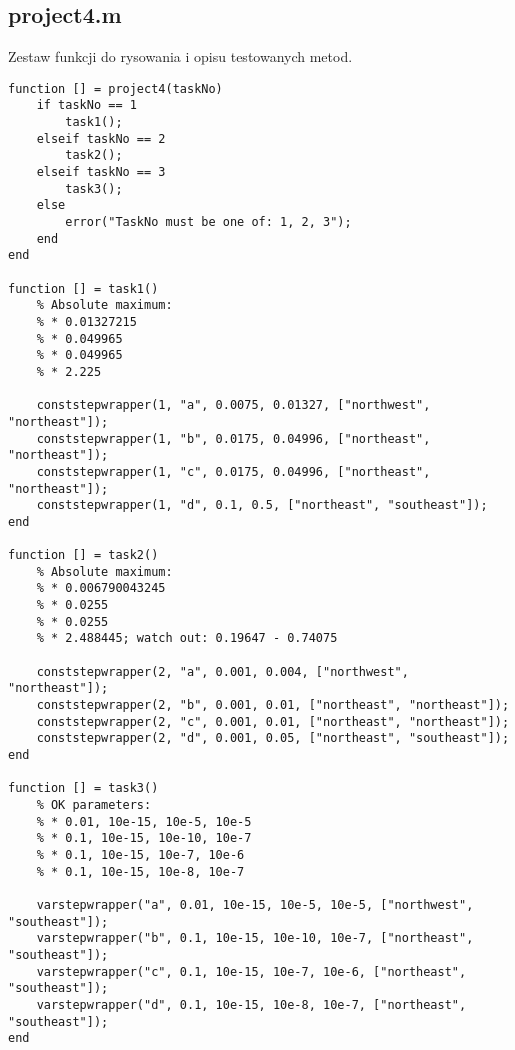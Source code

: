 \documentclass[12pt]{article}
\begin{document}
\subsection{project4.m}
Zestaw funkcji do rysowania i opisu testowanych metod.
\begin{verbatim}
function [] = project4(taskNo)
    if taskNo == 1
        task1();
    elseif taskNo == 2
        task2();
    elseif taskNo == 3
        task3();
    else
        error("TaskNo must be one of: 1, 2, 3");
    end
end

function [] = task1()
    % Absolute maximum:
    % * 0.01327215
    % * 0.049965
    % * 0.049965
    % * 2.225

    conststepwrapper(1, "a", 0.0075, 0.01327, ["northwest", "northeast"]);
    conststepwrapper(1, "b", 0.0175, 0.04996, ["northeast", "northeast"]);
    conststepwrapper(1, "c", 0.0175, 0.04996, ["northeast", "northeast"]);
    conststepwrapper(1, "d", 0.1, 0.5, ["northeast", "southeast"]);
end

function [] = task2()
    % Absolute maximum:
    % * 0.006790043245
    % * 0.0255
    % * 0.0255
    % * 2.488445; watch out: 0.19647 - 0.74075

    conststepwrapper(2, "a", 0.001, 0.004, ["northwest", "northeast"]);
    conststepwrapper(2, "b", 0.001, 0.01, ["northeast", "northeast"]);
    conststepwrapper(2, "c", 0.001, 0.01, ["northeast", "northeast"]);
    conststepwrapper(2, "d", 0.001, 0.05, ["northeast", "southeast"]);
end

function [] = task3()
    % OK parameters:
    % * 0.01, 10e-15, 10e-5, 10e-5
    % * 0.1, 10e-15, 10e-10, 10e-7
    % * 0.1, 10e-15, 10e-7, 10e-6
    % * 0.1, 10e-15, 10e-8, 10e-7

    varstepwrapper("a", 0.01, 10e-15, 10e-5, 10e-5, ["northwest", "southeast"]);
    varstepwrapper("b", 0.1, 10e-15, 10e-10, 10e-7, ["northeast", "southeast"]);
    varstepwrapper("c", 0.1, 10e-15, 10e-7, 10e-6, ["northeast", "southeast"]);
    varstepwrapper("d", 0.1, 10e-15, 10e-8, 10e-7, ["northeast", "southeast"]);
end


\end{verbatim}
\end{document}
